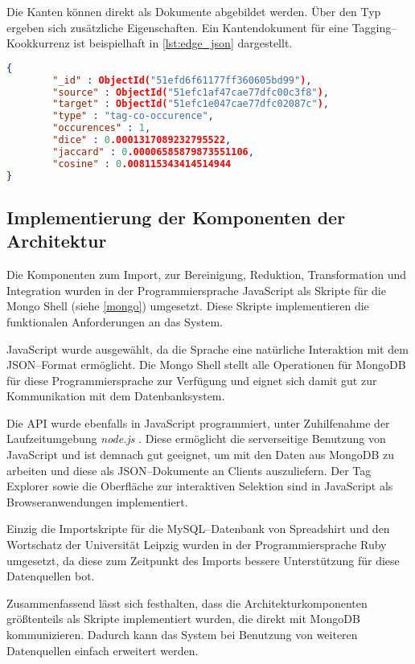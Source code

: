 Die Kanten können direkt als Dokumente abgebildet werden. Über den Typ ergeben sich zusätzliche Eigenschaften. Ein Kantendokument für eine Tagging--Kookkurrenz ist beispielhaft in  \cref{lst:edge_json} dargestellt.

\begin{lstlisting}[language=json, label={lst:edge_json}, caption={JSON--Beispiel für ein Kantendokument}, float=ht]
{
        "_id" : ObjectId("51efd6f61177ff360605bd99"),
        "source" : ObjectId("51efc1af47cae77dfc00c3f8"),
        "target" : ObjectId("51efc1e047cae77dfc02087c"),
        "type" : "tag-co-occurence",
        "occurences" : 1,
        "dice" : 0.0001317089232795522,
        "jaccard" : 0.00006585879873551106,
        "cosine" : 0.008115343414514944
}
\end{lstlisting}

\subsection{Implementierung der Komponenten der Architektur}
\label{arch_components_impl}

Die Komponenten zum Import, zur Bereinigung, Reduktion, Transformation und Integration wurden in der Programmiersprache JavaScript als Skripte für die Mongo Shell (siehe \cref{mongo}) umgesetzt. Diese Skripte implementieren die funktionalen Anforderungen an das System.

JavaScript wurde ausgewählt, da die Sprache eine natürliche Interaktion mit dem JSON--Format ermöglicht. Die Mongo Shell stellt alle Operationen für MongoDB für diese Programmiersprache zur Verfügung und eignet sich damit gut zur Kommunikation mit dem Datenbanksystem.

Die API wurde ebenfalls in JavaScript programmiert, unter Zuhilfenahme der Laufzeitumgebung \emph{node.js} \cite{node}. Diese ermöglicht die serverseitige Benutzung von JavaScript und ist demnach gut geeignet, um mit den Daten aus MongoDB zu arbeiten und diese als JSON--Dokumente an Clients auszuliefern. Der Tag Explorer sowie die Oberfläche zur interaktiven Selektion sind in JavaScript als Browseranwendungen implementiert.

Einzig die Importskripte für die MySQL--Datenbank von Spreadshirt und den Wortschatz der Universität Leipzig wurden in der Programmiersprache Ruby umgesetzt, da diese zum Zeitpunkt des Imports bessere Unterstützung für diese Datenquellen bot.

Zusammenfassend lässt sich festhalten, dass die Architekturkomponenten größtenteils als Skripte implementiert wurden, die direkt mit MongoDB kommunizieren. Dadurch kann das System bei Benutzung von weiteren Datenquellen einfach erweitert werden.

